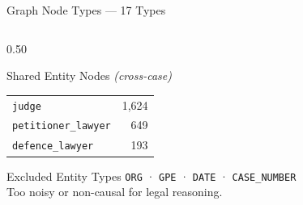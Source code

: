 \documentclass[aspectratio=169, 9pt]{beamer}
\begin{document}
\begin{frame}{Graph Node Types — 17 Types}
\begin{columns}[T]
\begin{column}{0.50\textwidth}
\begin{block}{\small Shared Entity Nodes \emph{(cross-case)}}
\begin{tabular}{lr}
          \texttt{judge}              &  1,624\\
          \texttt{petitioner\_lawyer} &    649\\
          \texttt{defence\_lawyer}    &    193\\
          \bottomrule
        \end{tabular}
      \end{block}
      \vspace{4pt}
      \begin{block}{\small Excluded Entity Types}
        \scriptsize
        \texttt{ORG} · \texttt{GPE} · \texttt{DATE} · \texttt{CASE\_NUMBER}\\
        Too noisy or non-causal for legal reasoning.
      \end{block}
    \end{column}
  \end{columns}
\end{frame}
\end{document}
